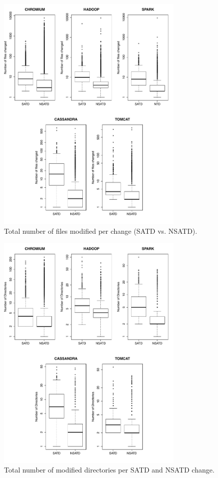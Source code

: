 \begin{figure}[!tb]
	\centering
	\includegraphics[width=90mm]{figures/chapter3/number_of_files_changed_all_projects}
	\caption{Total number of files modified per change (SATD vs. NSATD).}
	\label{figure:tfcpc}
\end{figure}

\begin{figure}[!tb]
	\centering
	\includegraphics[width=90mm]{figures/chapter3/number_of_directories}
	\caption{Total number of modified directories per SATD and NSATD change.}
	\label{figure:number_of_directories}
\end{figure}


